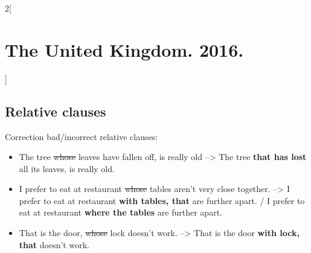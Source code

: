 \documentclass[10pt,a4paper]{article}
\newlength{\OriginalParIndent}
\newenvironment{ItemizeWithOrigParIndent}
    {\begin{itemize}[leftmargin=\OriginalParIndent]}
    {\end{itemize}}
\begin{document}
\begin{multicols}{2}[\section{The United Kingdom. 2016.}]
\subsection{Relative clauses}

Correction bad/incorrect relative clauses:
\begin{ItemizeWithOrigParIndent}
  \item The tree \sout{whose} leaves have fallen off, is really old --> The tree \textbf{that has lost} all its
  leaves, is really old.
  
  \item I prefer to eat at restaurant \sout{whose} tables aren't very close together. --> I prefer to eat
  at restaurant \textbf{with tables, that} are further apart. / I prefer to eat at restaurant  
  \textbf{where the tables} are further apart.
  
  \item That is the door, \sout{whose} lock doesn't work. --> That is the door \textbf{with lock, that} doesn't work.
\end{ItemizeWithOrigParIndent}






\end{multicols}
\end{document}

